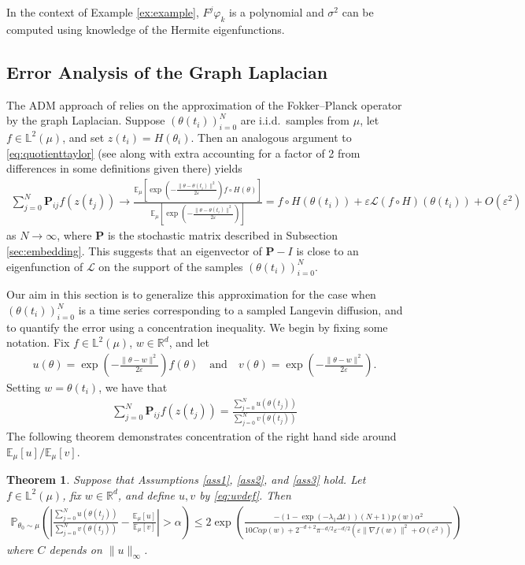 \documentclass[11pt]{article}
\theoremstyle{plain}
\newtheorem{theorem}{Theorem}[section]
\theoremstyle{definition}
\theoremstyle{remark}
\numberwithin{equation}{section}
\newcommand{\R}{\mathbb{R}}
\renewcommand{\L}{\mathscr{L}}
\newcommand{\lb}{\left}
\newcommand{\rb}{\right}
\newcommand{\veps}{\varepsilon}
\newcommand{\bP}{\mathbb{P}}
\newcommand{\bL}{\mathbb{L}}
\newcommand{\E}{\mathbb{E}}
\begin{document}
In the context of Example \ref{ex:example}, $F^j\varphi_k$ is a polynomial and $\sigma^2$ can be computed using knowledge of the Hermite eigenfunctions.

\subsection{Error Analysis of the Graph Laplacian}\label{sec:concentration}

The ADM approach of \citet{singer2008nonlinear} relies on the approximation of the Fokker--Planck operator by the graph Laplacian. Suppose $(\theta(t_i))_{i=0}^N$ are i.i.d.~samples from $\mu$, let $f\in \bL^2(\mu)$, and set $z(t_i)=H(\theta_i)$. Then an analogous argument to \eqref{eq:quotienttaylor} (see \citet[Equation (30)]{singer2008nonlinear} along with extra accounting for a factor of 2 from differences in some definitions given there) yields
\begin{align*}
\sum_{j=0}^N\mathbf{P}_{ij} f(z(t_j))\to \frac{\E_\mu \lb[\exp\lb(-\frac{\|\theta-\theta(t_i)\|^2}{2\veps}\rb)f\circ H(\theta)\rb]}{\E_\mu \lb[\exp\lb(-\frac{\|\theta-\theta(t_i)\|^2}{2\veps}\rb)\rb]}= f\circ H(\theta(t_i)) +\veps \L (f\circ H)(\theta(t_i))+O(\veps^2)
\end{align*}
as $N\to\infty$, where $\mathbf{P}$ is the stochastic matrix described in Subsection \ref{sec:embedding}.
This suggests that an eigenvector of $\mathbf{P}-I$ is close to an eigenfunction of $\L$ on the support of the samples $(\theta(t_i))_{i=0}^N$.

Our aim in this section is to generalize this approximation for the case when $(\theta(t_i))_{i=0}^N$ is a time series corresponding to a sampled Langevin diffusion, and to quantify the error using a concentration inequality.
We begin by fixing some notation. Fix $f\in \mathbb{L}^2(\mu)$, $w\in\R^d$, and let 
\begin{align}\label{eq:uvdef}
u(\theta)=\exp\lb(-\frac{\|\theta-w\|^2}{2\veps}\rb)f(\theta) \quad\text{and}\quad
v(\theta)=\exp\lb(-\frac{\|\theta-w\|^2}{2\veps}\rb).
\end{align}
Setting $w=\theta(t_i)$, we have that
\begin{align*}
\sum_{j=0}^N\mathbf{P}_{ij} f(z(t_j))=\frac{\sum_{j=0}^N u(\theta(t_j))}{\sum_{j=0}^Nv(\theta(t_j))}
\end{align*}
The following theorem demonstrates concentration of the right hand side around $\E_{\mu} [u]/\E_{\mu} [v]$.

\begin{theorem}\label{thm:concentration}
Suppose that Assumptions \ref{ass1}, \ref{ass2}, and \ref{ass3} hold. Let $f\in \mathbb{L}^2(\mu)$, fix $w\in \R^d$, and define $u,v$ by \eqref{eq:uvdef}. Then
\begin{align*}
\bP_{\theta_0\sim \mu}\lb(\lb|\frac{\sum_{j=0}^N u(\theta(t_j))}{\sum_{j=0}^Nv(\theta(t_j))} -\frac{\E_{\mu} [u]}{\E_{\mu} [v]}\rb|>\alpha \rb)\le 2\exp\lb(\frac{-(1-\exp(-\lambda_1 \Delta t))(N+1)p(w) \alpha^2}{10 C \alpha p(w)+2^{-d+2} \pi^{-d/2} \veps^{-d/2}\lb(\veps\|\nabla f(w)\|^2+O(\veps^2)\rb)}\rb)
\end{align*}
where $C$ depends on $\|u\|_\infty$.
\end{theorem}
\end{document}
